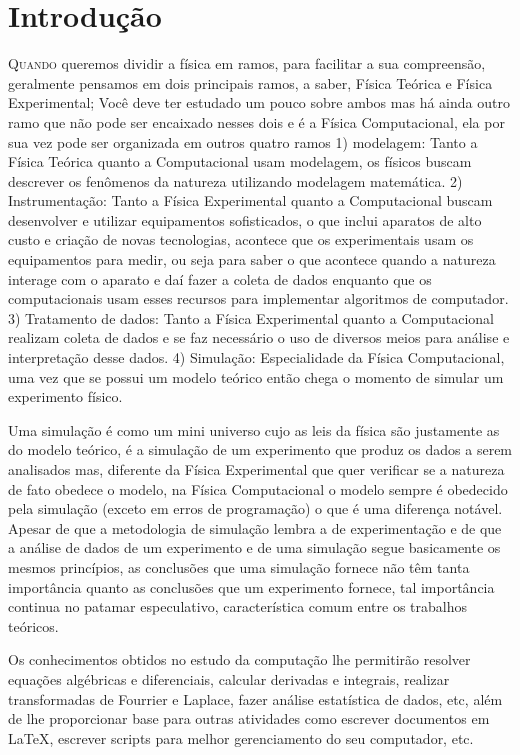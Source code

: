 \chapter{Introdução}

\lettrine{Q}{uando} queremos dividir a física em ramos, para facilitar a
sua compreensão, geralmente pensamos em dois principais ramos,
a saber, Física Teórica e Física Experimental; Você deve ter estudado um pouco sobre
ambos mas há ainda outro ramo que não pode ser encaixado nesses dois e é
a Física Computacional, ela por sua vez pode ser organizada em outros
quatro ramos 1) modelagem: Tanto a Física Teórica
quanto a Computacional usam modelagem,
os físicos buscam descrever os fenômenos da natureza utilizando modelagem matemática.
2) Instrumentação: Tanto a Física Experimental quanto a Computacional
buscam desenvolver e utilizar equipamentos sofisticados, o que inclui aparatos de
alto custo e criação de novas tecnologias, acontece que os
experimentais usam os equipamentos para medir, ou seja para saber o que acontece
quando a natureza interage com o aparato e daí fazer a coleta de dados enquanto
que os computacionais usam esses recursos para implementar algoritmos de computador.
3) Tratamento de dados: Tanto a Física Experimental quanto a Computacional
realizam coleta de dados e se faz necessário o uso de diversos meios
para análise e interpretação desse dados. 4) Simulação:
Especialidade da Física Computacional, uma vez que se possui um modelo teórico
então chega o momento de simular um experimento físico.

Uma simulação é como um mini universo cujo as leis da física
são justamente as do modelo teórico, é a simulação de um experimento que
produz os dados a serem analisados mas, diferente da Física Experimental que
quer verificar se a natureza de fato obedece o modelo, na Física
Computacional o modelo sempre é obedecido pela simulação (exceto em erros de
programação) o que é uma diferença notável. Apesar de que a metodologia
de simulação lembra a de experimentação e de que a análise de dados
de um experimento e de uma simulação segue basicamente os mesmos princípios,
as conclusões que uma simulação fornece não têm tanta importância quanto
as conclusões que um experimento fornece, tal importância continua no patamar
especulativo, característica comum entre os trabalhos teóricos.

Os conhecimentos obtidos no estudo da computação lhe permitirão
resolver equações algébricas e diferenciais, calcular derivadas e integrais,
realizar transformadas de Fourrier e Laplace, fazer análise estatística de dados,
etc, além de lhe proporcionar base para outras atividades como escrever
documentos em \LaTeX, escrever scripts para melhor gerenciamento do seu computador,
etc.

